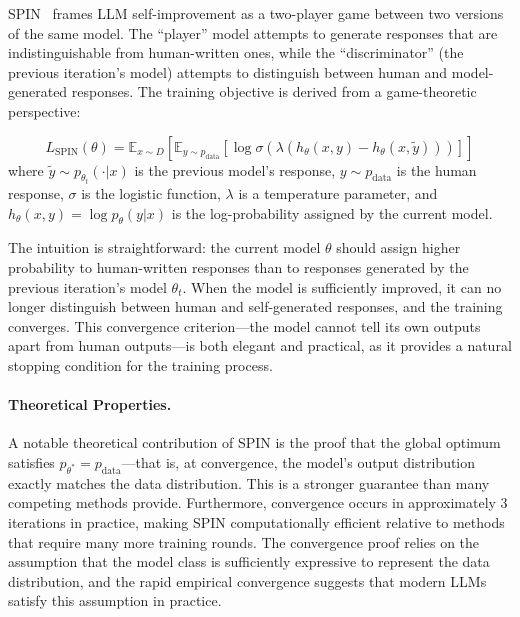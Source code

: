 SPIN~\citep{chen2024spin} frames LLM self-improvement as a two-player game between two versions of the same model. The ``player'' model attempts to generate responses that are indistinguishable from human-written ones, while the ``discriminator'' (the previous iteration's model) attempts to distinguish between human and model-generated responses. The training objective is derived from a game-theoretic perspective:

\begin{equation}
    L_{\text{SPIN}}(\theta) = \mathbb{E}_{x \sim D}\left[\mathbb{E}_{y \sim p_{\text{data}}}\left[\log \sigma\left(\lambda(h_\theta(x,y) - h_\theta(x,\tilde{y}))\right)\right]\right]
    \label{eq:spin}
\end{equation}
where $\tilde{y} \sim p_{\theta_t}(\cdot|x)$ is the previous model's response, $y \sim p_{\text{data}}$ is the human response, $\sigma$ is the logistic function, $\lambda$ is a temperature parameter, and $h_\theta(x, y) = \log p_\theta(y | x)$ is the log-probability assigned by the current model.

The intuition is straightforward: the current model $\theta$ should assign higher probability to human-written responses than to responses generated by the previous iteration's model $\theta_t$. When the model is sufficiently improved, it can no longer distinguish between human and self-generated responses, and the training converges. This convergence criterion---the model cannot tell its own outputs apart from human outputs---is both elegant and practical, as it provides a natural stopping condition for the training process.

\paragraph{Theoretical Properties.}
A notable theoretical contribution of SPIN is the proof that the global optimum satisfies $p_{\theta^*} = p_{\text{data}}$---that is, at convergence, the model's output distribution exactly matches the data distribution. This is a stronger guarantee than many competing methods provide. Furthermore, convergence occurs in approximately 3 iterations in practice, making SPIN computationally efficient relative to methods that require many more training rounds. The convergence proof relies on the assumption that the model class is sufficiently expressive to represent the data distribution, and the rapid empirical convergence suggests that modern LLMs satisfy this assumption in practice.

